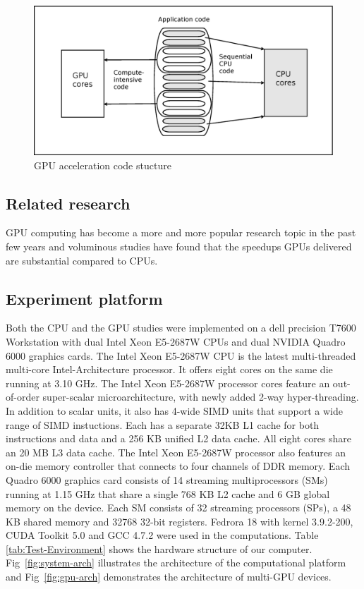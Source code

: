 \documentclass[mathpazo]{cicp}
\theoremstyle{theoremlike}
\theoremstyle{definition}
\theoremstyle{remark}
\newcommand{\Fig}[1]{Fig~\ref{#1}}
\begin{document}
\begin{figure}[htb]
\centering\includegraphics[scale=0.2]{fig_gpu_acceleration}
\caption{
\label{fig:GPU-acceleration-code-str}
GPU acceleration code stucture }
\end{figure}

\subsection{Related research}
GPU computing has become a more and more popular research topic in 
the past few years and voluminous studies have found that the 
speedups GPUs delivered are substantial compared to CPUs. 

\subsection{Experiment platform}
Both the CPU and the GPU studies were implemented on a dell 
precision T7600 Workstation with dual Intel Xeon 
E5-2687W CPUs and dual NVIDIA Quadro 6000 graphics cards. 
The Intel Xeon E5-2687W CPU is the latest multi-threaded multi-core 
Intel-Architecture processor. It offers eight cores on the same die running 
at 3.10 GHz. The Intel Xeon E5-2687W processor cores feature an
out-of-order super-scalar microarchitecture, with newly added 2-way 
hyper-threading. In addition to scalar units, it also has 4-wide SIMD units
that support a wide range of SIMD instuctions. Each has a separate 32KB L1 
cache for both instructions and data and a 256 KB unified L2 data cache.
All eight cores share an 20 MB L3 data cache. The Intel Xeon E5-2687W 
processor also features an on-die memory controller that connects to four 
channels of DDR memory.
Each Quadro 6000 graphics card consists of 14 streaming multiprocessors (SMs)
running at 1.15 GHz that share a single 768 KB L2 cache and 6 GB global
memory on the device. Each SM consists of 32 streaming processors (SPs),
a 48 KB shared memory and 32768 32-bit registers. Fedrora 18 with kernel 
3.9.2-200, CUDA Toolkit 5.0 and GCC 4.7.2 were used in the computations.
Table \ref{tab:Test-Environment} shows the hardware structure of our
computer. \Fig{fig:system-arch} illustrates the architecture of the 
computational platform and \Fig{fig:gpu-arch} demonstrates the 
architecture of multi-GPU devices.
\end{document}
